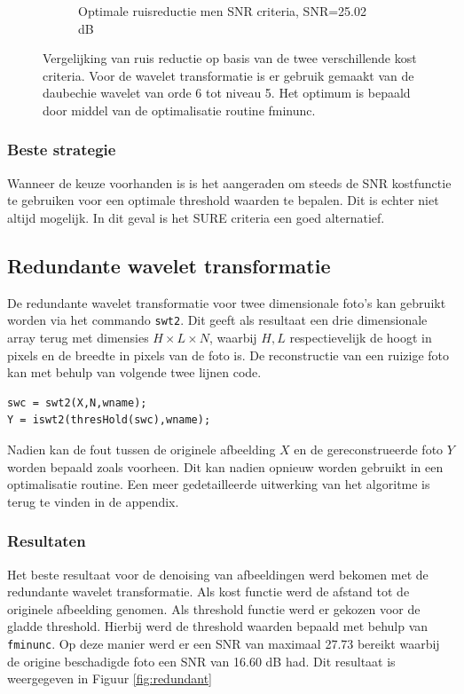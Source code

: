 \begin{figure}
\begin{subfigure}[b]{0.4\textwidth}
        \caption{Optimale ruisreductie men SNR criteria, SNR=25.02 dB}
    \end{subfigure}
    \caption{Vergelijking van ruis reductie op basis van de twee verschillende kost criteria. Voor de wavelet transformatie is er gebruik gemaakt van de daubechie wavelet van orde 6 tot niveau 5. Het optimum is bepaald door middel van de optimalisatie routine fminunc.}\label{fig:sure_snr}
\end{figure}

\subsubsection{Beste strategie}

Wanneer de keuze voorhanden is is het aangeraden om steeds de SNR kostfunctie te gebruiken voor een optimale threshold waarden te bepalen.
Dit is echter niet altijd mogelijk. In dit geval is het SURE criteria een goed alternatief.

\subsection{Redundante wavelet transformatie}

De redundante wavelet transformatie voor twee dimensionale foto's kan gebruikt worden via het commando \verb|swt2|.
Dit geeft als resultaat een drie dimensionale array terug met dimensies $ H\times L \times N $, waarbij $ H, L $ respectievelijk de hoogt in pixels en de breedte in pixels van de foto is.
De reconstructie van een ruizige foto kan met behulp van volgende twee lijnen code.
\begin{verbatim}
swc = swt2(X,N,wname);
Y = iswt2(thresHold(swc),wname);
\end{verbatim}
Nadien kan de fout tussen de originele afbeelding $ X $ en de gereconstrueerde foto $ Y $ worden bepaald zoals voorheen.
Dit kan nadien opnieuw worden gebruikt in een optimalisatie routine.
Een meer gedetailleerde uitwerking van het algoritme is terug te vinden in de appendix.
\subsubsection{Resultaten}

Het beste resultaat voor de denoising van afbeeldingen werd bekomen met de redundante wavelet transformatie.
Als kost functie werd de afstand tot de originele afbeelding genomen.
Als threshold functie werd er gekozen voor de gladde threshold.
Hierbij werd de threshold waarden bepaald met behulp van \verb|fminunc|.
Op deze manier werd er een SNR van maximaal 27.73 bereikt waarbij de origine beschadigde foto een SNR van 16.60 dB had.
Dit resultaat is weergegeven in Figuur \ref{fig:redundant}



